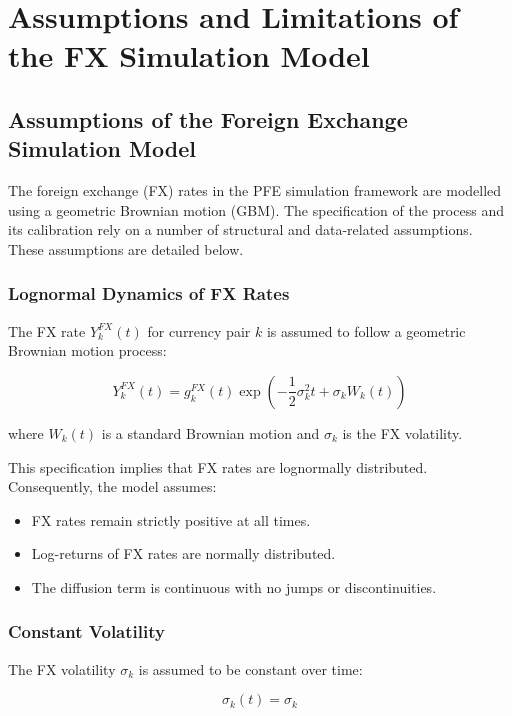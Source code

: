  
 \section{Assumptions and Limitations of the FX Simulation Model}
\subsection{Assumptions of the Foreign Exchange Simulation Model}

The foreign exchange (FX) rates in the PFE simulation framework are modelled using a geometric Brownian motion (GBM). 
The specification of the process and its calibration rely on a number of structural and data-related assumptions. 
These assumptions are detailed below.

\subsubsection{Lognormal Dynamics of FX Rates}

The FX rate $Y_k^{FX}(t)$ for currency pair $k$ is assumed to follow a geometric Brownian motion process:

\begin{equation}
	Y_k^{FX}(t)
	=
	g_k^{FX}(t)
	\exp
	\left(
	-\frac{1}{2}\sigma_k^2 t + \sigma_k W_k(t)
	\right)
\end{equation}

where $W_k(t)$ is a standard Brownian motion and $\sigma_k$ is the FX volatility.

This specification implies that FX rates are lognormally distributed. 
Consequently, the model assumes:

\begin{itemize}
	\item FX rates remain strictly positive at all times.
	\item Log-returns of FX rates are normally distributed.
	\item The diffusion term is continuous with no jumps or discontinuities.
\end{itemize}

\subsubsection{Constant Volatility}

The FX volatility $\sigma_k$ is assumed to be constant over time:

\begin{equation}
	\sigma_k(t) = \sigma_k
\end{equation}


